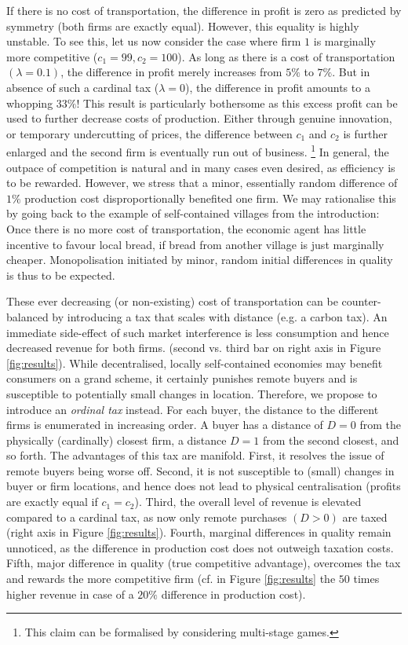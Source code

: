 \documentclass[final,5p,times,twocolumn,11pt,authoryear]{elsarticle}
\numberwithin{equation}{section} %
\begin{document}
If there is no cost of transportation, the difference in profit is zero as predicted by symmetry (both firms are exactly equal).
However, this equality is highly unstable. 
To see this, let us now consider the case where firm $1$ is marginally more competitive ($c_1 = 99, c_2 =100$). 
As long as there is a cost of transportation $(\lambda=0.1)$, the difference in profit merely increases from $5\%$ to $7\%$.
But in absence of such a cardinal tax ($\lambda=0$), the difference in profit amounts to a whopping $33\%$!
This result is particularly bothersome as this excess profit can be used to further decrease costs of production.
Either through genuine innovation, or temporary undercutting of prices, the difference between $c_1$ and $c_2$ is further enlarged and the second firm is eventually run out of business. 
\footnote{
This claim can be formalised by considering multi-stage games.
} 
In general, the outpace of competition is natural and in many cases even desired, as efficiency is to be rewarded. 
However, we stress that a minor, essentially random difference of $1\%$ production cost disproportionally benefited one firm. 
We may rationalise this by going back to the example of self-contained villages from the introduction: 
Once there is no more cost of transportation, the economic agent has little incentive to favour local bread, if bread from another village is just marginally cheaper. 
Monopolisation initiated by minor, random initial differences in quality is thus to be expected. 

These ever decreasing (or non-existing) cost of transportation can be counter-balanced by introducing a tax that scales with distance (e.g. a carbon tax). 
An immediate side-effect of such market interference is less consumption and hence decreased revenue for both firms. (second vs. third bar on right axis in Figure \ref{fig:results}). 
While decentralised, locally self-contained economies may benefit consumers on a grand scheme, it certainly punishes remote buyers and is susceptible to potentially small changes in location. 
Therefore, we propose to introduce an \textit{ordinal tax} instead. 
For each buyer, the distance to the different firms is enumerated in increasing order. 
A buyer has a distance of $D=0$ from the physically (cardinally) closest firm, a distance $D=1$ from the second closest, and so forth. 
The advantages of this tax are manifold. 
First, it resolves the issue of remote buyers being worse off. 
Second, it is not susceptible to (small) changes in buyer or firm locations, and hence does not lead to physical centralisation (profits are exactly equal if $c_1=c_2$). 
Third, the overall level of revenue is elevated compared to a cardinal tax, as now only remote purchases $(D > 0)$ are taxed (right axis in Figure \ref{fig:results}). 
Fourth, marginal differences in quality remain unnoticed, as the difference in production cost does not outweigh taxation costs. 
Fifth, major difference in quality (true competitive advantage), overcomes the tax and rewards the more competitive firm 
(cf. in Figure \ref{fig:results} the $50$ times higher revenue in case of a $20\%$ difference in production cost). 
\end{document}
